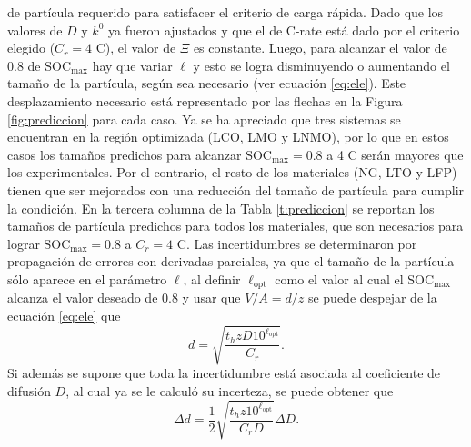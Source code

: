 de partícula requerido para satisfacer el criterio de carga rápida. Dado que los
valores de $D$ y $k^0$ ya fueron ajustados
y que el de C-rate está dado por el criterio elegido ($C_r = 4$ C), el valor de $\Xi$ es constante. Luego,
para alcanzar el valor de 0.8 de SOC$_{\max}$ hay que variar $\ell$ y esto se
logra disminuyendo o aumentando el tamaño de la partícula, según sea necesario (ver ecuación \ref{eq:ele}).
Este desplazamiento necesario está representado por las flechas en la Figura 
\ref{fig:prediccion} para cada caso. Ya se ha apreciado que tres sistemas se 
encuentran en la región optimizada (LCO, LMO y LNMO), por lo que en estos casos
los tamaños predichos para alcanzar SOC$_{\max} = 0.8$ a 4 C serán mayores que 
los experimentales. Por el contrario, el resto de los materiales (NG, LTO y LFP) 
tienen que ser mejorados con una reducción del tamaño de partícula
para cumplir la condición. En la tercera columna de la Tabla \ref{t:prediccion} 
se reportan los tamaños de partícula predichos para todos los materiales, que son necesarios para lograr SOC$_{\max} = 0.8$ a $C_r = 4$ C. 
Las incertidumbres se determinaron por propagación de errores con 
derivadas parciales, ya que el tamaño de la partícula sólo aparece en el parámetro
$\ell$, al definir $\ell_{\text{opt}}$ como el valor al cual el SOC$_{\max}$ 
alcanza el valor deseado de 0.8 y usar que $V/A = d/z$ se puede despejar de la 
ecuación \ref{eq:ele} que
\begin{equation}
    d = \sqrt{\frac{t_h z D 10^{\ell_{\text{opt}}}}{C_r}}.
\end{equation}
Si además se supone que toda la incertidumbre está asociada al coeficiente de 
difusión $D$, al cual ya se le calculó su incerteza, se puede obtener que
\begin{equation}
    \Delta d = \frac{1}{2} \sqrt{\frac{t_h z 10^{\ell_{\text{opt}}}}{C_r D}} \Delta D.
\end{equation}

